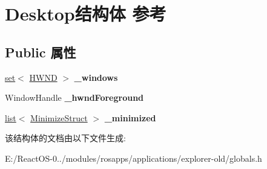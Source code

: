 \hypertarget{struct_desktop}{}\section{Desktop结构体 参考}
\label{struct_desktop}
\subsection*{Public 属性}
\begin{DoxyCompactItemize}
\item 
\mbox{\label{struct_desktop_a6a028ffb19969c20abb05ef84c585803}} 
\hyperlink{classset}{set}$<$ \hyperlink{interfacevoid}{H\+W\+ND} $>$ {\bfseries \+\_\+windows}
\item 
\mbox{\label{struct_desktop_add12e5b61ea0c524d043bafb7fe898e9}} 
Window\+Handle {\bfseries \+\_\+hwnd\+Foreground}
\item 
\mbox{\label{struct_desktop_acb60c4db6a74523df819242f43406c30}} 
\hyperlink{classlist}{list}$<$ \hyperlink{structpair}{Minimize\+Struct} $>$ {\bfseries \+\_\+minimized}
\end{DoxyCompactItemize}


该结构体的文档由以下文件生成\+:\begin{DoxyCompactItemize}
\item 
E\+:/\+React\+O\+S-\/0../modules/rosapps/applications/explorer-\/old/globals.\+h\end{DoxyCompactItemize}
